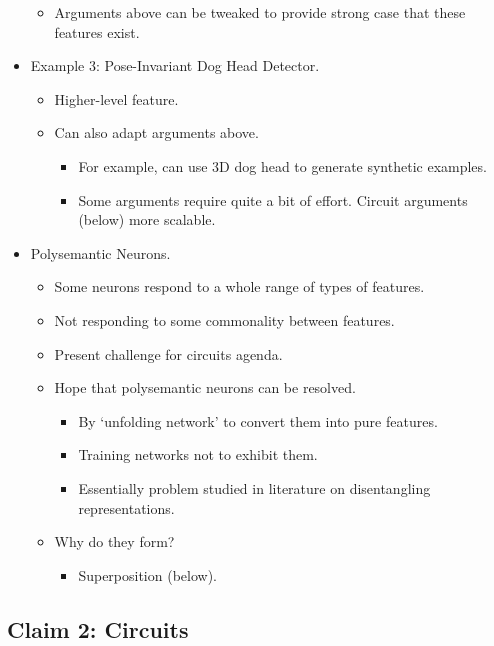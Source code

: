 \begin{itemize}
\begin{itemize}
        \item Arguments above can be tweaked to provide strong case that these features exist.
    \end{itemize}
    \item Example 3: Pose-Invariant Dog Head Detector.
    \begin{itemize}
        \item Higher-level feature.
        \item Can also adapt arguments above.
        \begin{itemize}
            \item For example, can use 3D dog head to generate synthetic examples.
            \item Some arguments require quite a bit of effort. Circuit arguments (below) more scalable.
        \end{itemize}
    \end{itemize}
    \item Polysemantic Neurons.
    \begin{itemize}
        \item Some neurons respond to a whole range of types of features.
        \item Not responding to some commonality between features.
        \item Present challenge for circuits agenda.
        \item Hope that polysemantic neurons can be resolved.
        \begin{itemize}
            \item By `unfolding network' to convert them into pure features.
            \item Training networks not to exhibit them.
            \item Essentially problem studied in literature on disentangling representations.
        \end{itemize}
        \item Why do they form?
        \begin{itemize}
            \item Superposition (below).
        \end{itemize}
    \end{itemize}
\end{itemize}


\subsection{Claim 2: Circuits}

